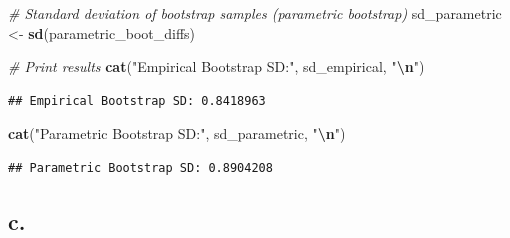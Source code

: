 \documentclass[
]{article}
\newenvironment{Shaded}{\begin{snugshade}}{\end{snugshade}}
\newcommand{\CommentTok}[1]{\textcolor[rgb]{0.56,0.35,0.01}{\textit{#1}}}
\newcommand{\DecValTok}[1]{\textcolor[rgb]{0.00,0.00,0.81}{#1}}
\newcommand{\FloatTok}[1]{\textcolor[rgb]{0.00,0.00,0.81}{#1}}
\newcommand{\FunctionTok}[1]{\textcolor[rgb]{0.13,0.29,0.53}{\textbf{#1}}}
\newcommand{\NormalTok}[1]{#1}
\newcommand{\OtherTok}[1]{\textcolor[rgb]{0.56,0.35,0.01}{#1}}
\newcommand{\SpecialCharTok}[1]{\textcolor[rgb]{0.81,0.36,0.00}{\textbf{#1}}}
\newcommand{\StringTok}[1]{\textcolor[rgb]{0.31,0.60,0.02}{#1}}
\begin{document}
\begin{Shaded}
\begin{Highlighting}[]
\CommentTok{\# Standard deviation of bootstrap samples (parametric bootstrap)}
\NormalTok{sd\_parametric }\OtherTok{\textless{}{-}} \FunctionTok{sd}\NormalTok{(parametric\_boot\_diffs)}

\CommentTok{\# Print results}
\FunctionTok{cat}\NormalTok{(}\StringTok{"Empirical Bootstrap SD:"}\NormalTok{, sd\_empirical, }\StringTok{"}\SpecialCharTok{\textbackslash{}n}\StringTok{"}\NormalTok{)}
\end{Highlighting}
\end{Shaded}

\begin{verbatim}
## Empirical Bootstrap SD: 0.8418963
\end{verbatim}

\begin{Shaded}
\begin{Highlighting}[]
\FunctionTok{cat}\NormalTok{(}\StringTok{"Parametric Bootstrap SD:"}\NormalTok{, sd\_parametric, }\StringTok{"}\SpecialCharTok{\textbackslash{}n}\StringTok{"}\NormalTok{)}
\end{Highlighting}
\end{Shaded}

\begin{verbatim}
## Parametric Bootstrap SD: 0.8904208
\end{verbatim}

\subsection{c.}\label{c.}

\begin{Shaded}
\end{Shaded}
\end{document}
